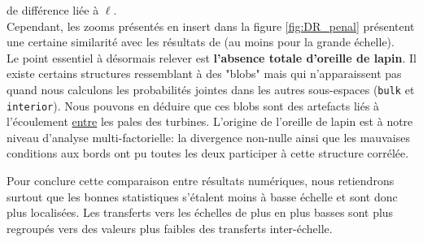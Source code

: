 \documentclass[13pt, a4paper]{extarticle}
\begin{document}
 de différence liée à $\ell$. \\
Cependant, les zooms présentés en insert dans la figure \ref{fig:DR_penal} 
présentent une certaine similarité avec les résultats de \cite{Faller-Intermittency} 
(au moins pour la grande échelle). \\

\noindent Le point essentiel à désormais relever est {\bf l'absence totale d'oreille 
de lapin}. Il existe certains structures ressemblant à des "blobs" mais qui 
n'apparaissent pas quand nous calculons les probabilités jointes dans les autres 
sous-espaces (\texttt{bulk} et \texttt{interior}). Nous pouvons en déduire que 
ces blobs sont des artefacts liés à l'écoulement \ul{entre} les pales des turbines. 
L'origine de l'oreille de lapin est à notre niveau d'analyse multi-factorielle: 
la divergence non-nulle ainsi que les mauvaises conditions aux bords ont pu toutes 
les deux participer à cette structure corrélée. 

\noindent Pour conclure cette comparaison entre résultats numériques, nous 
retiendrons surtout que les bonnes statistiques s'étalent moins à basse échelle 
et sont donc plus localisées. Les transferts vers les échelles de plus en plus 
basses sont plus regroupés vers des valeurs plus faibles des transferts inter-échelle.
\end{document}
